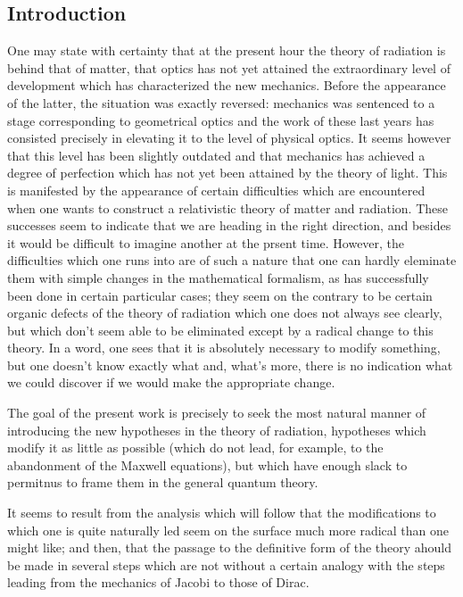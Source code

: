 \documentclass{article}
\begin{document}
\begin{multicols}{2}
\section{Introduction}
One may state with certainty that at the present hour the theory of radiation is behind that of matter, that optics has not yet attained the extraordinary level of development which has characterized the new mechanics. Before the appearance of the latter, the situation was exactly reversed: mechanics was sentenced to a stage corresponding to geometrical optics and the work of these last years has consisted precisely in elevating it to the level of physical optics. It seems however that this level has been slightly outdated and that mechanics has achieved a degree of perfection which has not yet been attained by the theory of light. This is manifested by the appearance of certain difficulties which are encountered when one wants to construct a relativistic theory of matter and radiation. These successes seem to indicate that we are heading in the right direction, and besides it would be difficult to imagine another at the prsent time. However, the difficulties which one runs into are of such a nature that one can hardly eleminate them with simple changes in the mathematical formalism, as has successfully been done in certain particular cases; they seem on the contrary to be certain organic defects of the theory of radiation which one does not always see clearly, but which don't seem able to be eliminated except by a radical change to this theory. In a word, one sees that it is absolutely necessary to modify something, but one doesn't know exactly what and, what's more, there is no indication what we could discover if we would make the appropriate change.

The goal of the present work is precisely to seek the most natural manner of introducing the new hypotheses in the theory of radiation, hypotheses which modify it as little as possible (which do not lead, for example, to the abandonment of the Maxwell equations), but which have enough slack to permitnus to frame them in the general quantum theory.

It seems to result from the analysis which will follow that the modifications to which one is quite naturally led seem on the surface much more radical than one might like; and then, that the passage to the definitive form of the theory ahould be made in several steps which are not without a certain analogy with the steps leading from the mechanics of Jacobi to those of Dirac.


\end{multicols}
\end{document}
